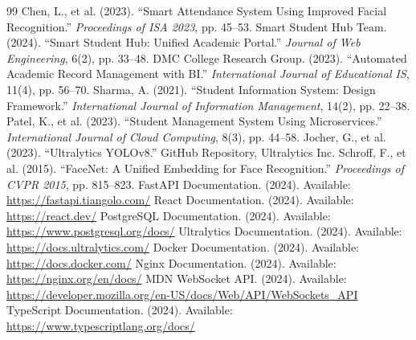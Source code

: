 \documentclass[12pt,a4paper,oneside]{report}
\begin{document}
\begin{thebibliography}{99}
 Chen, L., et al. (2023). ``Smart Attendance System Using Improved Facial Recognition.'' \textit{Proceedings of ISA 2023}, pp. 45--53.
 Smart Student Hub Team. (2024). ``Smart Student Hub: Unified Academic Portal.'' \textit{Journal of Web Engineering}, 6(2), pp. 33--48.
 DMC College Research Group. (2023). ``Automated Academic Record Management with BI.'' \textit{International Journal of Educational IS}, 11(4), pp. 56--70.
 Sharma, A. (2021). ``Student Information System: Design Framework.'' \textit{International Journal of Information Management}, 14(2), pp. 22--38.
 Patel, K., et al. (2023). ``Student Management System Using Microservices.'' \textit{International Journal of Cloud Computing}, 8(3), pp. 44--58.
 Jocher, G., et al. (2023). ``Ultralytics YOLOv8.'' GitHub Repository, Ultralytics Inc.
 Schroff, F., et al. (2015). ``FaceNet: A Unified Embedding for Face Recognition.'' \textit{Proceedings of CVPR 2015}, pp. 815--823.
 FastAPI Documentation. (2024). Available: \url{https://fastapi.tiangolo.com/}
 React Documentation. (2024). Available: \url{https://react.dev/}
 PostgreSQL Documentation. (2024). Available: \url{https://www.postgresql.org/docs/}
 Ultralytics Documentation. (2024). Available: \url{https://docs.ultralytics.com/}
 Docker Documentation. (2024). Available: \url{https://docs.docker.com/}
 Nginx Documentation. (2024). Available: \url{https://nginx.org/en/docs/}
 MDN WebSocket API. (2024). Available: \url{https://developer.mozilla.org/en-US/docs/Web/API/WebSockets_API}
 TypeScript Documentation. (2024). Available: \url{https://www.typescriptlang.org/docs/}
\end{thebibliography}
\end{document}
